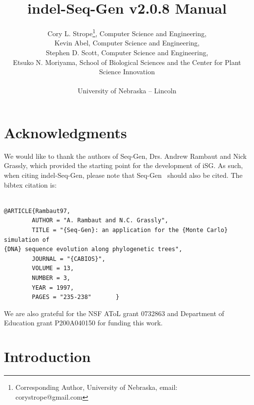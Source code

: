 \documentclass[10pt]{article}
\newcommand{\version}{2.0.8 }
\newcommand{\iSGcurrentlong}{indel-Seq-Gen v\version }
\begin{document}

\title{\iSGcurrentlong Manual}
\author{Cory L. Strope\thanks{Corresponding Author, University of Nebraska, email:
        corystrope@gmail.com}, Computer Science and Engineering,\\
        Kevin Abel, Computer Science and Engineering,\\
        Stephen D. Scott, Computer Science and Engineering,\\
        Etsuko N. Moriyama, School of Biological Sciences and the Center for Plant Science Innovation\\~\\
		University of Nebraska -- Lincoln
}

\maketitle

\tableofcontents
\newpage
\section{Acknowledgments}

We would like to thank the authors of Seq-Gen, Drs. Andrew Rambaut and Nick Grassly, which provided the starting point for the development of iSG. As such, when citing indel-Seq-Gen, please note that Seq-Gen~\cite{Rambaut97} should also be cited. The bibtex citation is:

\begin{verbatim}

@ARTICLE{Rambaut97,
        AUTHOR = "A. Rambaut and N.C. Grassly",
        TITLE = "{Seq-Gen}: an application for the {Monte Carlo} simulation of
{DNA} sequence evolution along phylogenetic trees",
        JOURNAL = "{CABIOS}",
        VOLUME = 13,
        NUMBER = 3,
        YEAR = 1997,
        PAGES = "235-238"       }

\end{verbatim}

We are also grateful for the NSF AToL grant 0732863 and Department of Education grant P200A040150 for funding this work.

\newpage

\section{Introduction}
\end{document}
